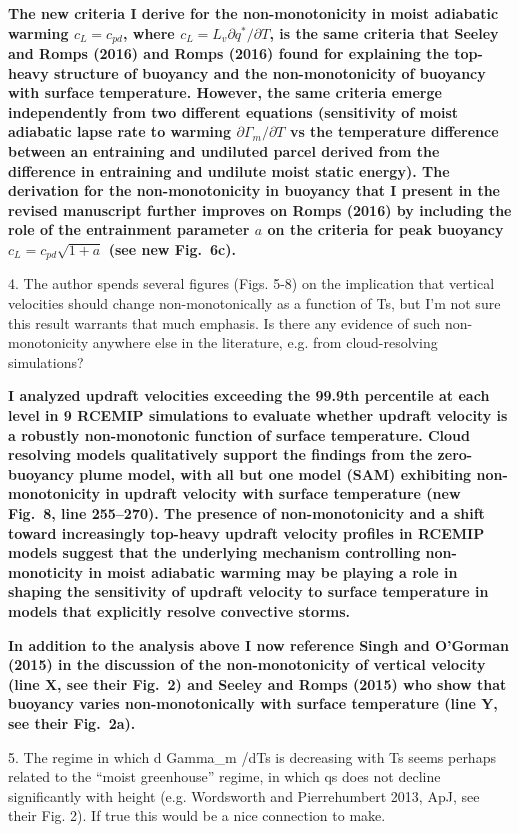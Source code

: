 \documentclass{article}
\begin{document}
\par
\textbf{The new criteria I derive for the non-monotonicity in moist adiabatic warming $c_L=c_{pd}$, where $c_L=L_v\partial q^* / \partial T$, is the same criteria that Seeley and Romps (2016) and Romps (2016) found for explaining the top-heavy structure of buoyancy and the non-monotonicity of buoyancy with surface temperature. However, the same criteria emerge independently from two different equations (sensitivity of moist adiabatic lapse rate to warming $\partial \Gamma_m / \partial T$ vs the temperature difference between an entraining and undiluted parcel derived from the difference in entraining and undilute moist static energy). The derivation for the non-monotonicity in buoyancy that I present in the revised manuscript further improves on Romps (2016) by including the role of the entrainment parameter $a$ on the criteria for peak buoyancy $c_L=c_{pd}\sqrt{1+a}$ (see new Fig.~6c).}
\par
4. The author spends several figures (Figs. 5-8) on the implication that vertical velocities should change non-monotonically as a function of Ts, but I'm not sure this result warrants that much emphasis. Is there any evidence of such non-monotonicity anywhere else in the literature, e.g. from cloud-resolving simulations?
\par
\textbf{I analyzed updraft velocities exceeding the 99.9th percentile at each level in 9 RCEMIP simulations to evaluate whether updraft velocity is a robustly non-monotonic function of surface temperature. Cloud resolving models qualitatively support the findings from the zero-buoyancy plume model, with all but one model (SAM) exhibiting non-monotonicity in updraft velocity with surface temperature (new Fig.~8, line 255--270). The presence of non-monotonicity and a shift toward increasingly top-heavy updraft velocity profiles in RCEMIP models suggest that the underlying mechanism controlling non-monoticity in moist adiabatic warming may be playing a role in shaping the sensitivity of updraft velocity to surface temperature in models that explicitly resolve convective storms.}
\par
\textbf{In addition to the analysis above I now reference Singh and O'Gorman (2015) in the discussion of the non-monotonicity of vertical velocity (line X, see their Fig.~2) and Seeley and Romps (2015) who show that buoyancy varies non-monotonically with surface temperature (line Y, see their Fig.~2a).}
\par
5. The regime in which d Gamma\_m /dTs is decreasing with Ts seems perhaps related to the ``moist greenhouse'' regime, in which qs does not decline significantly with height (e.g. Wordsworth and Pierrehumbert 2013, ApJ, see their Fig. 2). If true this would be a nice connection to make.
\end{document}
